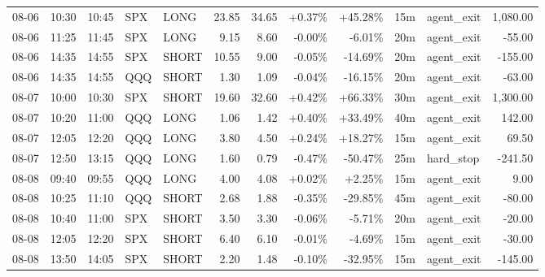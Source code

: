 \documentclass[11pt,a4paper]{article}
\begin{document}
\begin{center}
\begin{longtable}{>{\color{txtmain}}l l l l l r r r r r >{\color{txtmain}}l r}
08-06 & 10:30 & 10:45 & SPX & LONG & 23.85 & 34.65 & \textcolor{wingreen}{+0.37\%} & \textcolor{wingreen}{+45.28\%} & 15m & agent\_exit & \textcolor{wingreen}{1,080.00} \\
08-06 & 11:25 & 11:45 & SPX & LONG & 9.15 & 8.60 & \textcolor{lossred}{-0.00\%} & \textcolor{lossred}{-6.01\%} & 20m & agent\_exit & \textcolor{lossred}{-55.00} \\
08-06 & 14:35 & 14:55 & SPX & SHORT & 10.55 & 9.00 & \textcolor{lossred}{-0.05\%} & \textcolor{lossred}{-14.69\%} & 20m & agent\_exit & \textcolor{lossred}{-155.00} \\
08-06 & 14:35 & 14:55 & QQQ & SHORT & 1.30 & 1.09 & \textcolor{lossred}{-0.04\%} & \textcolor{lossred}{-16.15\%} & 20m & agent\_exit & \textcolor{lossred}{-63.00} \\
08-07 & 10:00 & 10:30 & SPX & SHORT & 19.60 & 32.60 & \textcolor{wingreen}{+0.42\%} & \textcolor{wingreen}{+66.33\%} & 30m & agent\_exit & \textcolor{wingreen}{1,300.00} \\
08-07 & 10:20 & 11:00 & QQQ & LONG & 1.06 & 1.42 & \textcolor{wingreen}{+0.40\%} & \textcolor{wingreen}{+33.49\%} & 40m & agent\_exit & \textcolor{wingreen}{142.00} \\
08-07 & 12:05 & 12:20 & QQQ & LONG & 3.80 & 4.50 & \textcolor{wingreen}{+0.24\%} & \textcolor{wingreen}{+18.27\%} & 15m & agent\_exit & \textcolor{wingreen}{69.50} \\
08-07 & 12:50 & 13:15 & QQQ & LONG & 1.60 & 0.79 & \textcolor{lossred}{-0.47\%} & \textcolor{lossred}{-50.47\%} & 25m & hard\_stop & \textcolor{lossred}{-241.50} \\
08-08 & 09:40 & 09:55 & QQQ & LONG & 4.00 & 4.08 & \textcolor{wingreen}{+0.02\%} & \textcolor{wingreen}{+2.25\%} & 15m & agent\_exit & \textcolor{wingreen}{9.00} \\
08-08 & 10:25 & 11:10 & QQQ & SHORT & 2.68 & 1.88 & \textcolor{lossred}{-0.35\%} & \textcolor{lossred}{-29.85\%} & 45m & agent\_exit & \textcolor{lossred}{-80.00} \\
08-08 & 10:40 & 11:00 & SPX & SHORT & 3.50 & 3.30 & \textcolor{lossred}{-0.06\%} & \textcolor{lossred}{-5.71\%} & 20m & agent\_exit & \textcolor{lossred}{-20.00} \\
08-08 & 12:05 & 12:20 & SPX & SHORT & 6.40 & 6.10 & \textcolor{lossred}{-0.01\%} & \textcolor{lossred}{-4.69\%} & 15m & agent\_exit & \textcolor{lossred}{-30.00} \\
08-08 & 13:50 & 14:05 & SPX & SHORT & 2.20 & 1.48 & \textcolor{lossred}{-0.10\%} & \textcolor{lossred}{-32.95\%} & 15m & agent\_exit & \textcolor{lossred}{-145.00} \\

\end{longtable}
\end{center}
\end{document}
